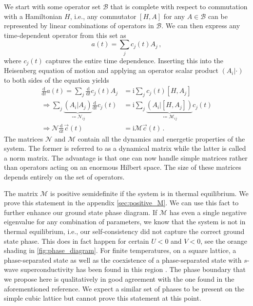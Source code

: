 \documentclass[
    reprint, 
    aps,
    preprintnumbers,
    twocolumn,
    prb,
    superscriptaddress
]{revtex4-2}
\newcommand{\im}{\mathrm{i}}
\newcommand{\ddt}{\frac{\mathrm{d}}{\mathrm{d}t}}
\newcommand{\mM}{\mathcal{M}}
\newcommand{\mN}{\mathcal{N}}
\begin{document}
We start with some operator set $\mathcal{B}$ that is complete with respect to commutation with a Hamiltonian $H$, 
i.e., any commutator $[H, A]$ for any $A \in \mathcal{B}$ can be represented by linear combinations of operators in $\mathcal{B}$.
We can then express any time-dependent operator from this set as
\begin{equation}
    \label{eqn:time_dependent_operator}
    a(t) = \sum_j c_j(t) A_j\,,
\end{equation}
where $c_j(t)$ captures the entire time dependence. 
Inserting this into the Heisenberg equation of motion and applying an operator scalar product $(A_i|\cdot)$ to both sides of the equation yields
\begin{equation}
    \label{eqn:heisenberg}
    \begin{aligned}
        \ddt a(t) = \sum_j \ddt c_j(t) A_j &= \im \sum_j c_j(t) [H, A_j] \\
        \Rightarrow \sum_j \underbrace{(A_i | A_j)}_{\coloneqq \mN_{ij}} \ddt c_j(t) &= \im \sum_j \underbrace{(A_i | [H, A_j])}_{\coloneqq \mM_{ij}} c_j(t) \\
        \Rightarrow \mN \ddt \vec{c}(t) &= \im \mM \vec{c}(t)\,.
    \end{aligned}
\end{equation}
The matrices $\mN$ and $\mM$ contain all the dynamics and energetic properties of the system.
The former is referred to as a dynamical matrix while the latter is called a norm matrix.
The advantage is that one can now handle simple matrices rather than operators acting on an enormous Hilbert space.
The size of these matrices depends entirely on the set of operators.

The matrix $\mM$ is positive semidefinite if the system is in thermal equilibrium.
We prove this statement in the appendix \ref{sec:positive_M}.
We can use this fact to further enhance our ground state phase diagram.
If $\mM$ has even a single negative eigenvalue for any combination of parameters, we know that the system is not in thermal equilibrium, 
i.e., our self-consistency did not capture the correct ground state phase.
This does in fact happen for certain $U<0$ and $V<0$, see the orange shading in \autoref{fig:phase_diagram}.
For finite temperatures, on a square lattice, a phase-separated state as well as the coexistence of a phase-separated state with $s$-wave superconductivity has been found in this region \cite{Linner23}.
The phase boundary that we propose here is qualitatively in good agreement with the one found in the aforementioned reference.
We expect a similar set of phases to be present on the simple cubic lattice but cannot prove this statement at this point.
\end{document}

